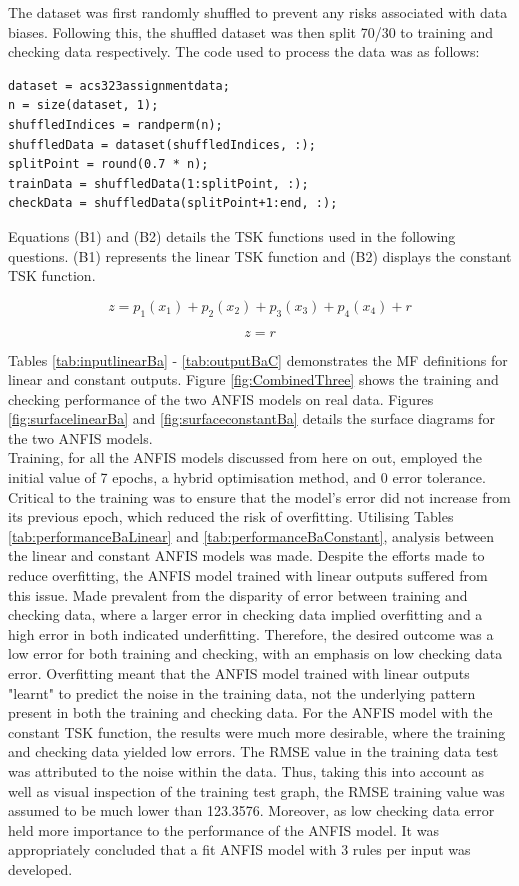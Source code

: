 \documentclass[12pt]{article}
\begin{document}
The dataset was first randomly shuffled to prevent any risks associated with data biases. 
Following this, the shuffled dataset was then split 70/30 to training and checking data respectively.
The code used to process the data was as follows:

\begin{verbatim}
dataset = acs323assignmentdata;
n = size(dataset, 1);
shuffledIndices = randperm(n);
shuffledData = dataset(shuffledIndices, :);
splitPoint = round(0.7 * n);
trainData = shuffledData(1:splitPoint, :);
checkData = shuffledData(splitPoint+1:end, :);
\end{verbatim}

Equations (B1) and (B2) details the TSK functions used in the following questions.
(B1) represents the linear TSK function and (B2) displays the constant TSK function. 

\begin{equation}
z = p_1(x_1) + p_2(x_2) + p_3(x_3) + p_4(x_4) + r
\tag{B1}
\end{equation}

\begin{equation}
z = r 
\tag{B2}
\end{equation}

Tables \ref{tab:inputlinearBa} - \ref{tab:outputBaC} demonstrates the MF definitions for linear and constant outputs.
Figure \ref{fig:CombinedThree} shows the training and checking performance of the two ANFIS models on real data.
Figures \ref{fig:surfacelinearBa} and \ref{fig:surfaceconstantBa} details the surface diagrams for the two ANFIS models.
\\

Training, for all the ANFIS models discussed from here on out, employed the initial value of 7 epochs, a hybrid optimisation method, and 0 error tolerance.
Critical to the training was to ensure that the model's error did not increase from its previous epoch, which reduced the risk of overfitting.
Utilising Tables \ref{tab:performanceBaLinear} and \ref{tab:performanceBaConstant}, analysis between the linear and constant ANFIS models was made.
Despite the efforts made to reduce overfitting, the ANFIS model trained with linear outputs suffered from this issue.
Made prevalent from the disparity of error between training and checking data, where a larger error in checking data implied overfitting and a high error in both indicated underfitting.
Therefore, the desired outcome was a low error for both training and checking, with an emphasis on low checking data error.
Overfitting meant that the ANFIS model trained with linear outputs "learnt" to predict the noise in the training data, not the underlying pattern present in both the training and checking data.
For the ANFIS model with the constant TSK function, the results were much more desirable, where the training and checking data yielded low errors.
The RMSE value in the training data test was attributed to the noise within the data.
Thus, taking this into account as well as visual inspection of the training test graph, the RMSE training value was assumed to be much lower than 123.3576.
Moreover, as low checking data error held more importance to the performance of the ANFIS model.
It was appropriately concluded that a fit ANFIS model with 3 rules per input was developed.
\end{document}
